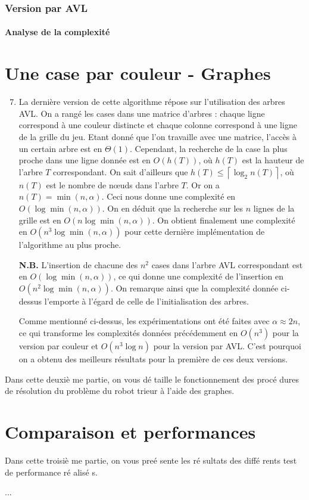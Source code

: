 \documentclass[12pt,a4paper]{article}
\begin{document}
\section{Version par AVL}
\subsection*{Analyse de la complexit\'e}

\part{Une case par couleur - Graphes}
\begin{enumerate}
\setcounter{enumi}{6}
\item La derni\`ere version de cette algorithme r\'epose sur l'utilisation des 
arbres AVL. On a rang\'e les cases dans une matrice d'arbres : chaque ligne 
correspond \`a une couleur distincte et chaque colonne correspond \`a une ligne 
de la grille du jeu. Etant donn\'e que l'on travaille avec une matrice, 
l'acc\`es \`a un certain arbre est en $\Theta(1)$. Cependant, la recherche de 
la case la plus proche dans une ligne donn\'ee est en $O(h(T))$, o\`u $h(T)$ 
est la hauteur de l'arbre $T$ correspondant. On sait d'ailleurs que $h(T) \leq 
\left \lceil \log_2 n(T) \right \rceil$, o\`u $n(T)$ est le nombre de 
n\oe uds dans l'arbre $T$. Or on a $n(T) = \min(n,\alpha)$. 
Ceci nous donne une complexit\'e en $O(\log \min(n,\alpha))$. On en d\'eduit 
que la recherche sur les $n$ lignes de la grille est en $O(n\log 
\min(n,\alpha))$. On obtient finalement une complexit\'e en $O(n^3\log 
\min(n,\alpha))$ pour cette derni\`ere impl\'ementation de l'algorithme au plus 
proche.

{\bfseries N.B.} L'insertion de chacune des $n^2$ cases dans l'arbre 
AVL correspondant est en $O(\log \min(n,\alpha))$, ce qui donne une 
complexit\'e de l'insertion en $O(n^2\log \min(n,\alpha))$. On remarque ainsi 
que la complexit\'e donn\'ee ci-dessus l'emporte \`a l'\'egard de celle de 
l'initialisation des arbres. \par
Comme mentionn\'e ci-dessus, les exp\'erimentations ont \'et\'e faites avec 
$\alpha \approx 2n$, ce qui transforme les complexit\'es donn\'ees 
pr\'ec\'edemment en $O(n^3)$ pour la version par couleur et $O(n^3\log n)$ pour 
la version par AVL. C'est pourquoi on a obtenu des meilleurs r\'esultats pour 
la premi\`ere de ces deux versions.
\end{enumerate}

Dans cette deuxi\`e me partie, on vous d\'e taille le fonctionnement des proc\'e dures de r\'esolution du probl\`eme du robot trieur \`a l'aide des graphes.

\part{Comparaison et performances}
Dans cette troisi\`e me partie, on vous pre\'e sente les r\'e sultats des diff\'e rents test de performance r\'e alis\'e s.

...
\end{document}
